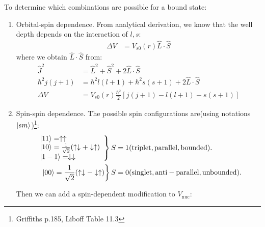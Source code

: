 \documentclass{school-22.101-notes}
\begin{document}
To determine which combinations are possible for a bound state:
\begin{enumerate}
\item Orbital-spin dependence. From analytical derivation, we know that the well depth depends on the interaction of $l, s$: 
  \begin{align}
  \Delta V &= V_{s0} (r) \hat{L} \cdot \hat{S}
  \end{align}
  where we obtain $\hat{L} \cdot \hat{S}$ from: 
  \begin{align}
    \hat{J}^2 &= \hat{L}^2 + \hat{S}^2 + 2  \hat{L} \cdot \hat{S} \\
    \hbar^2 j(j+1) &= \hbar^2 l(l+1) + \hbar^2 s(s+1) + 2 \hat{L} \cdot \hat{S} \\
    \Delta V &= V_{s0} (r) \frac{\hbar^2}{2} \left[ j(j+1) - l(l+1) - s(s+1) \right] 
  \end{align}

\item Spin-spin dependence. The possible spin configurations are(using notations $\left| s m \right>$)\footnote{Griffiths p.185, Liboff Table 11.3}: 
\begin{align}
\left. \begin{array}{l} 
\left| 1 1 \right> = \uparrow \uparrow \\
\left| 1 0 \right> = \frac{1}{\sqrt{2}} (\uparrow \downarrow + \downarrow \uparrow ) \\
\left| 1 -1 \right> = \downarrow \downarrow
\end{array} \right\}
S &= 1  (\mathrm{triplet, parallel, bounded}). \\
\left. \left| 0 0 \right> = \frac{1}{\sqrt{2}} (\uparrow \downarrow - \downarrow \uparrow ) \right\} 
S &= 0  (\mathrm{singlet, anti-parallel, unbounded}).
\end{align}

Then we can add a spin-dependent modification to $V_{\mathrm{nuc}}$:


\end{enumerate}
\end{document}
